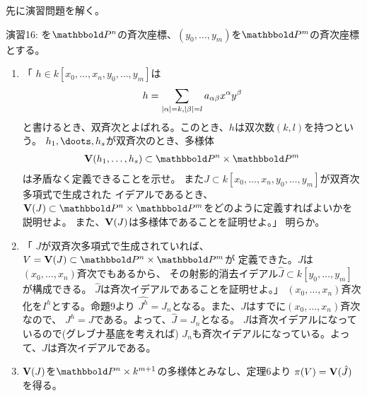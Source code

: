 先に演習問題を解く。
\begin{framed}
  演習16:
  \xs を$\P^n$の斉次座標、$(y_0,\dots,y_m)$を$\P^m$の斉次座標とする。
  \begin{enumerate}[label=(\alph*)]
    \item 「
    $h\in k[x_0,\dots,x_n,y_0,\dots,y_m]$は
    \begin{align}
      h=\sum_{\left|\alpha\right|=k,\left|\beta\right|=l}a_{\alpha \beta}x^\alpha y^\beta
    \end{align}
    と書けるとき、双斉次とよばれる。このとき、$h$は双次数$(k,l)$を持つという。
    $h_1,\doots,h_s$が双斉次のとき、多様体
    \begin{align}
      \var(h_1,\dots,h_s) \subset \P^n  \times \P^m
    \end{align}
    は矛盾なく定義できることを示せ。
    また$J\subset k[x_0,\dots,x_n,y_0,\dots,y_m]$が双斉次多項式で生成された
    イデアルであるとき、$\var(J)\subset \P^n \times \P^m$をどのように定義すればよいかを説明せよ。
    また、$\textbf V(J)$は多様体であることを証明せよ。」
    明らか。
    \item
    「
    $J$が双斉次多項式で生成されていれば、$V=\var(J)\subset \P^n \times \P^m$が
    定義できた。$J$は$(x_0,\dots,x_n)$斉次でもあるから、
    その射影的消去イデアル$\hat J \subset k[y_0,\dots,y_m]$が構成できる。
    $\hat J$は斉次イデアルであることを証明せよ。」
    $(x_0,\dots,x_n)$斉次化を$I^h$とする。命題9より
    $\hat{J^h}=J_n$となる。また、$J$はすでに$(x_0,\dots,x_n)$斉次なので、
    $J^h = J$である。よって、$\hat J = J_n$となる。
    $J$は斉次イデアルになっているので(グレブナ基底を考えれば)
    $J_n$も斉次イデアルになっている。よって、$\hat J$は斉次イデアルである。
    \item
    $\textbf V(J)$を$\P^n\times k^{m+1}$の多様体とみなし、定理6より
    $\pi(V) = \textbf V(\hat J)$を得る。
  \end{enumerate}
\end{framed}

